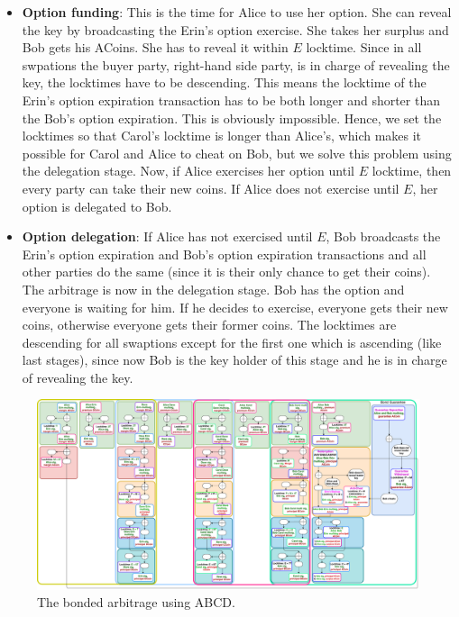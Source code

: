 \begin{itemize}
    \item \textbf{Option funding}: This is the time for Alice to use her option. She can reveal the \Atwo key by broadcasting the Erin's option exercise. She takes her surplus and Bob gets his ACoins. She has to reveal it within $E$ locktime. Since in all swpations the buyer party,
    \ie right-hand side party, is in charge of revealing the \Atwo key, the locktimes have to be descending. This means the locktime of the Erin's option expiration transaction has to be both longer and shorter than the Bob's option expiration. This is obviously impossible. Hence, we set the locktimes so that Carol's locktime is longer than Alice's, which makes it possible for Carol and Alice to cheat on Bob, but we solve this problem using the delegation stage. Now, if Alice exercises her option until $E$ locktime, then every party can take their new coins. If Alice does not exercise until $E$, her option is delegated to Bob.
    
    \item \textbf{Option delegation}: If Alice has not exercised until $E$, Bob broadcasts the Erin's option expiration and Bob's option expiration transactions and all other parties do the same (since it is their only chance to get their coins). The arbitrage is now in the delegation stage. Bob has the option and everyone is waiting for him. If he decides to exercise, everyone gets their new coins, otherwise everyone gets their former coins. The locktimes are descending for all swaptions except for the first one which is ascending (like last stages), since now Bob is the key holder of this stage and he is in charge of revealing the \Delegation key. 
 
\end{itemize}
\begin{figure}
    \centering
    \includegraphics[width=\textwidth]{figures/arbitrage-bonded.pdf}
    \caption{The bonded arbitrage using ABCD.}
    \label{fig:abcd-arb}
\end{figure}

